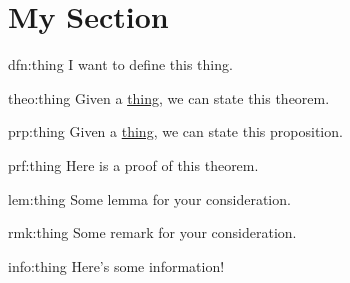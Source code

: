



\section{My Section}\label{sec:my-section}

\begin{dfn}{dfn:thing}
    I want to define this thing.
\end{dfn}

\begin{theo}{theo:thing}
    Given a \hyperref[dfn:thing]{thing}, we can state this theorem.
\end{theo}

\begin{prp}{prp:thing}
    Given a \hyperref[dfn:thing]{thing}, we can state this proposition.
\end{prp}

\begin{prf}{prf:thing}
    Here is a proof of this theorem.
\end{prf}

\begin{lem}{lem:thing}
    Some lemma for your consideration.
\end{lem}

\begin{rmk}{rmk:thing}
    Some remark for your consideration.
\end{rmk}

\begin{info}{info:thing}
    Here's some information!
\end{info}



